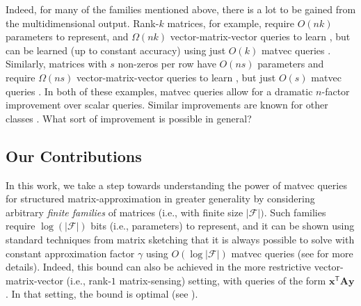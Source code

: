 \documentclass{article}[11pt]
\theoremstyle{definition}
\newcommand{\bv}[1]{\boldsymbol{\mathbf{#1}}}
\newcommand{\transpose}{\mathsf{T}}
\begin{document}
Indeed, for many of the families mentioned above, there is a lot to be gained from the multidimensional output. Rank-$k$ matrices, for example, require $O(nk)$ parameters to represent, and $\Omega(nk)$ vector-matrix-vector queries to learn \cite{CandesPlan:2011}, but can be learned (up to constant accuracy) using just $O(k)$ matvec queries \cite{BakshiClarksonWoodruff:2022}. Similarly, matrices with $s$ non-zeros per row have $O(ns)$ parameters and require $\Omega(ns)$ vector-matrix-vector queries to learn \cite{DasarathyShahBhaskar:2015}, but just $O(s)$ matvec queries \cite{AmselChenHalikias:2024}.
%
In both of these examples, matvec queries allow for a dramatic $n$-factor improvement over scalar queries. Similar improvements are known for other classes \cite{ChenHalikiasKeles:2025,AmselChenHalikias:2025}. What sort of improvement is possible in general?

\subsection{Our Contributions}\label{sec:contributions}
In this work, we take a step towards understanding the power of matvec queries for structured matrix-approximation in greater generality by considering arbitrary \emph{finite families} of matrices (i.e., with finite size $|\mathcal{F}|)$. Such families require $\log(|\mathcal{F}|)$ bits (i.e., parameters) to represent, and it can be shown using standard techniques from matrix sketching that it is always possible to solve  with constant approximation factor $\gamma$ using $O(\log|\mathcal{F}|)$ matvec queries (see  for more details). Indeed, this bound can also be achieved in the more restrictive vector-matrix-vector (i.e., rank-$1$ matrix-sensing) setting, with queries of the form $\bv{x}^\transpose\bv{A}\bv{y}$. In that setting, the bound is optimal (see ).
\end{document}
